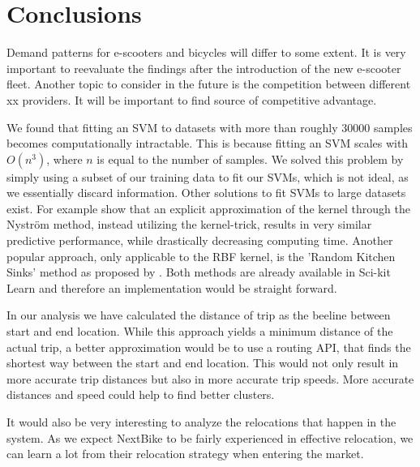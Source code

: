 \section{Conclusions}
\label{sec:conclusions}

Demand patterns for e-scooters and bicycles will differ to some extent. It is very important to reevaluate the findings after the introduction of the new e-scooter fleet. Another topic to consider in the future is the competition between different xx providers. It will be important to find source of competitive advantage.



We found that fitting an SVM to datasets with more than roughly \(30000\) samples becomes computationally intractable.
This is because fitting an SVM scales with \(O(n^3)\), where \(n\) is equal to the number of samples.
We solved this problem by simply using a subset of our training data to fit our SVMs, which is not ideal, as we essentially discard information.
Other solutions to fit SVMs to large datasets exist. For example   show that an explicit approximation of the kernel through the Nyström method, instead utilizing the kernel-trick,  results in very similar predictive performance, while drastically decreasing computing time. Another popular approach, only applicable to the RBF kernel, is the 'Random Kitchen Sinks' method as proposed by . Both methods are already available in Sci-kit Learn and therefore an implementation would be straight forward.

In our analysis we have calculated the distance of trip as the beeline between start and end location.
While this approach yields a minimum distance of the actual trip, a better approximation would be to use a routing API, that finds the shortest way between the start and end location.
This would not only result in more accurate trip distances but also in more accurate trip speeds.
More accurate distances and speed could help to find better clusters.

It would also be very interesting to analyze the relocations that happen in the system.
As we expect NextBike to be fairly experienced in effective relocation, we can learn a lot from their relocation strategy when entering the market.

